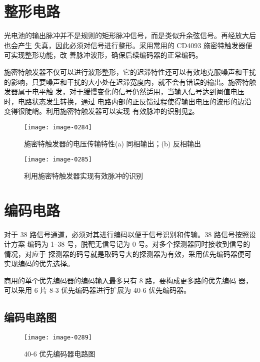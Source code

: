 \clearpage
\vspace*{-1.5em}
\section[整形电路]{整形电路\cite{cn11}}

光电池的输出脉冲并不是规则的矩形脉冲信号，而是类似升余弦信号。再经放大后也会产生
失真，因此必须对信号进行整形。采用常用的 CD4093 施密特触发器便可实现整形功能，改
善脉冲波形，确保后续编码器的正常编码。

施密特触发器不仅可以进行波形整形，它的迟滞特性还可以有效地克服噪声和干扰的影响，只要噪声和干扰的大小处在迟滞宽度内，就不会有错误的输出。施密特触发器属于电平触
发，对于缓慢变化的信号仍然适用，当输入信号达到阈值电压时，电路状态发生转换，通过
电路内部的正反馈过程使得输出电压的波形的边沿变得很陡峭。利用施密特触发器可以实现
有效脉冲的识别见\cref{4-5}。

\begin{figure}[htbp]
  \centering
  \texttt{[image: image-0284]}
  \caption{施密特触发器的电压传输特性\quad (a) 同相输出；(b) 反相输出}
  \label{4-4}
\end{figure}

\begin{figure}[htbp]
  \centering
  \texttt{[image: image-0285]}
  \caption{利用施密特触发器实现有效脉冲的识别}
  \label{4-5}
\end{figure}

\section[编码电路]{编码电路\cite{cn11}}

对于 38 路信号通道，必须对其进行编码以便于信号识别和传输。38 路信号按照设计方案
编码为 1--38 号，脱靶无信号记为 0 号。对多个探测器同时接收到信号的情况，对应于
探测器的码号就是取码号大的探测器为有效，采用优先编码器便可实现编码的优先选择。

商用的单个优先编码器的编码输入最多只有 8 路，要构成更多路的优先编码
器，可以采用 6 片 8-3 优先编码器进行扩展为 40-6 优先编码器。

\subsection{编码电路图}

\begin{figure}[htbp]
  \centering
  \texttt{[image: image-0289]}
  \caption{40-6 优先编码器电路图}
  \label{4-6}
\end{figure}

